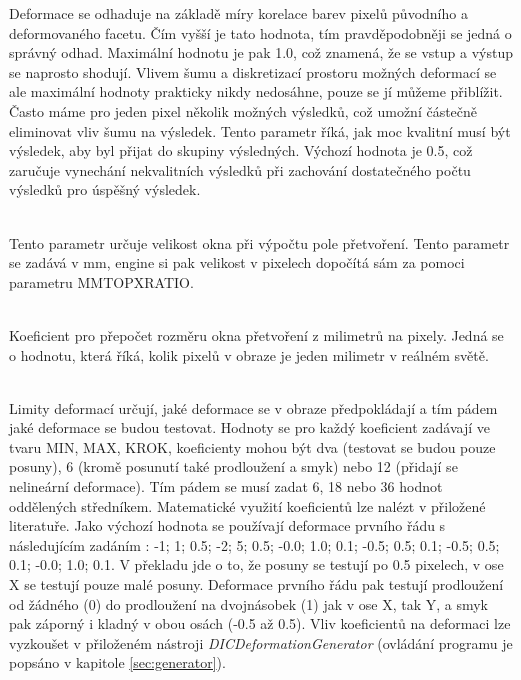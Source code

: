 \documentclass[a4paper,12pt]{article}
\begin{document}
\begin{description}
Deformace se odhaduje na základě míry korelace barev pixelů původního a deformovaného facetu. Čím vyšší je tato hodnota, tím pravděpodobněji se jedná o správný odhad. Maximální hodnotu je pak 1.0, což znamená, že se vstup a výstup se naprosto shodují. Vlivem šumu a diskretizací prostoru možných deformací se ale maximální hodnoty prakticky nikdy nedosáhne, pouze se jí můžeme přiblížit. Často máme pro jeden pixel několik možných výsledků, což umožní částečně eliminovat vliv šumu na výsledek. Tento parametr říká, jak moc kvalitní musí být výsledek, aby byl přijat do skupiny výsledných. Výchozí hodnota je 0.5, což zaručuje vynechání nekvalitních výsledků při zachování dostatečného počtu výsledků pro úspěšný výsledek. 
\item[STRAIN\textunderscore ESTIMATION\textunderscore PARAM] [double]\\
Tento parametr určuje velikost okna při výpočtu pole přetvoření. Tento parametr se zadává v mm, engine si pak velikost v pixelech dopočítá sám za pomoci parametru MM\textunderscore TO\textunderscore PX\textunderscore RATIO.
\item[MM\textunderscore TO\textunderscore PX\textunderscore RATIO] [double]\\
Koeficient pro přepočet rozměru okna přetvoření z milimetrů na pixely. Jedná se o hodnotu, která říká, kolik pixelů v obraze je jeden milimetr v reálném světě.
\item[DEFORMATION\textunderscore LIMITS] [double ; double ; double...]\\
Limity deformací určují, jaké deformace se v obraze předpokládají a tím pádem jaké deformace se budou testovat. Hodnoty se pro každý koeficient zadávají ve tvaru MIN, MAX, KROK, koeficienty mohou být dva (testovat se budou pouze posuny), 6 (kromě posunutí také prodloužení a smyk) nebo 12 (přidají se nelineární deformace). Tím pádem se musí zadat 6, 18 nebo 36 hodnot oddělených středníkem. Matematické využití koeficientů lze nalézt v přiložené literatuře. Jako výchozí hodnota se používají deformace prvního řádu s následujícím zadáním : -1; 1; 0.5; -2; 5; 0.5; -0.0; 1.0; 0.1; -0.5; 0.5; 0.1; -0.5; 0.5; 0.1; -0.0; 1.0; 0.1. V překladu jde o to, že posuny se testují po 0.5 pixelech, v ose X se testují pouze malé posuny. Deformace prvního řádu pak testují prodloužení od žádného (0) do prodloužení na dvojnásobek (1) jak v ose X, tak Y, a smyk pak záporný i kladný v obou osách (-0.5 až 0.5). Vliv koeficientů na deformaci lze vyzkoušet v přiloženém nástroji \emph{DIC\textunderscore DeformationGenerator} (ovládání programu je popsáno v kapitole \ref{sec:generator}).
\end{description}
\newpage
\end{document}
